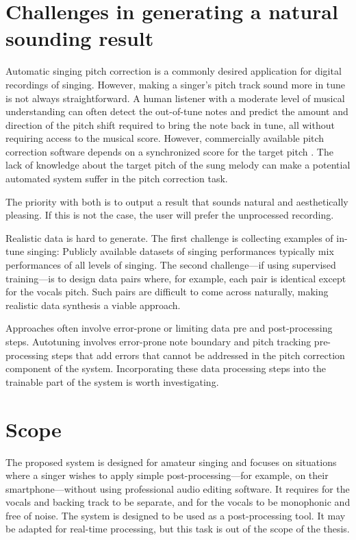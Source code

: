 \section{Challenges in generating a natural sounding result}

Automatic singing pitch correction is a commonly desired application for digital recordings of singing. However, making a singer's pitch track sound more in tune is not always straightforward. A human listener with a moderate level of musical understanding can often detect the out-of-tune notes and predict the amount and direction of the pitch shift required to bring the note back in tune, all without requiring access to the musical score. However, commercially available pitch correction software depends on a synchronized score for the target pitch \cite{antares:2016}. The lack of knowledge about the target pitch of the sung melody can make a potential automated system suffer in the pitch correction task.

The priority with both is to output a result that sounds natural and aesthetically pleasing. If this is not the case, the user will prefer the unprocessed recording. 

Realistic data is hard to generate. The first challenge is collecting examples of in-tune singing: Publicly available datasets of singing performances typically mix performances of all levels of singing. The second challenge---if using supervised training---is to design data pairs where, for example, each pair is identical except for the vocals pitch. Such pairs are difficult to come across naturally, making realistic data synthesis a viable approach.

Approaches often involve error-prone or limiting data pre and post-processing steps. Autotuning involves error-prone note boundary and pitch tracking pre-processing steps that add errors that cannot be addressed in the pitch correction component of the system. Incorporating these data processing steps into the trainable part of the system is worth investigating.

\section{Scope}
The proposed system is designed for amateur singing and focuses on situations where a singer wishes to apply simple post-processing---for example, on their smartphone---without using professional audio editing software. It requires for the vocals and backing track to be separate, and for the vocals to be monophonic and free of noise. The system is designed to be used as a post-processing tool. It may be adapted for real-time processing, but this task is out of the scope of the thesis.

